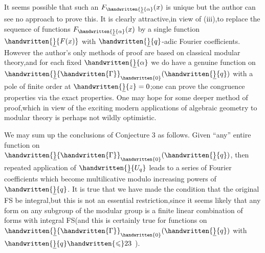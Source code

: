 It seems possible that such an $F_{\handwritten{\underline}{\alpha}}(x)$ is unique but the author can see no approach to prove this. It is clearly attractive,in view of (iii),to replace the sequence of functions $F_{\handwritten{\underline}{\alpha}}(x)$ by a single function $\handwritten{\underline}{F(x)}$ with $\handwritten{\underline}{q}$-adic Fourier coefficients. However the author's only methods of proof are based on classical modular theory,and for each fixed $\handwritten{\underline}{\alpha}$ we do have a genuine function on $\handwritten{\underline}{\handwritten{\Gamma}}_{\handwritten{0}}(\handwritten{\underline}{q})$ with a pole of finite order at $\handwritten{\underline}{z}=0$;one can prove the congruence properties via the exact properties. One may hope for some deeper method of proof,which in view of the exciting modern applications of algebraic geometry to modular theory is perhaps not wildly optimistic.

We may sum up the conclusions of Conjecture 3 as follows. Given ``any'' entire function on $\handwritten{\underline}{\handwritten{\Gamma}}_{\handwritten{0}}(\handwritten{\underline}{q})$, then repeated application of $\handwritten{\underline}{U_q}$ leads to a series of Fourier coefficients which become multilicative modulo increasing powers of $\handwritten{\underline}{q}$. It is true that we have made the condition that the original FS be integral,but this is not an essential restriction,since it seems likely that any form on any  subgroup of the modular group is a finite linear combination of forms with integral FS(and this is certainly true for functions on $\handwritten{\underline}{\handwritten{\Gamma}}_{\handwritten{0}}(\handwritten{\underline}{q})$ with $\handwritten{\underline}{q}\handwritten{\leqslant}23$ ).
\par\noindent\hspace*{.25\linewidth}
